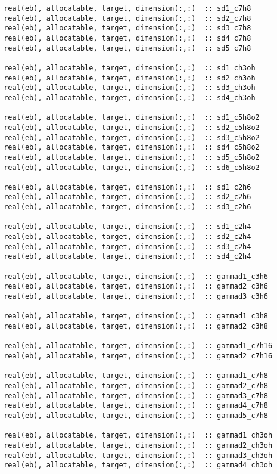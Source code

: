 \begin{lstlisting}
 real(eb), allocatable, target, dimension(:,:)  :: sd1_c7h8
 real(eb), allocatable, target, dimension(:,:)  :: sd2_c7h8
 real(eb), allocatable, target, dimension(:,:)  :: sd3_c7h8
 real(eb), allocatable, target, dimension(:,:)  :: sd4_c7h8
 real(eb), allocatable, target, dimension(:,:)  :: sd5_c7h8

 real(eb), allocatable, target, dimension(:,:)  :: sd1_ch3oh
 real(eb), allocatable, target, dimension(:,:)  :: sd2_ch3oh
 real(eb), allocatable, target, dimension(:,:)  :: sd3_ch3oh
 real(eb), allocatable, target, dimension(:,:)  :: sd4_ch3oh

 real(eb), allocatable, target, dimension(:,:)  :: sd1_c5h8o2
 real(eb), allocatable, target, dimension(:,:)  :: sd2_c5h8o2
 real(eb), allocatable, target, dimension(:,:)  :: sd3_c5h8o2
 real(eb), allocatable, target, dimension(:,:)  :: sd4_c5h8o2
 real(eb), allocatable, target, dimension(:,:)  :: sd5_c5h8o2
 real(eb), allocatable, target, dimension(:,:)  :: sd6_c5h8o2

 real(eb), allocatable, target, dimension(:,:)  :: sd1_c2h6
 real(eb), allocatable, target, dimension(:,:)  :: sd2_c2h6
 real(eb), allocatable, target, dimension(:,:)  :: sd3_c2h6

 real(eb), allocatable, target, dimension(:,:)  :: sd1_c2h4
 real(eb), allocatable, target, dimension(:,:)  :: sd2_c2h4
 real(eb), allocatable, target, dimension(:,:)  :: sd3_c2h4
 real(eb), allocatable, target, dimension(:,:)  :: sd4_c2h4

 real(eb), allocatable, target, dimension(:,:)  :: gammad1_c3h6
 real(eb), allocatable, target, dimension(:,:)  :: gammad2_c3h6
 real(eb), allocatable, target, dimension(:,:)  :: gammad3_c3h6

 real(eb), allocatable, target, dimension(:,:)  :: gammad1_c3h8
 real(eb), allocatable, target, dimension(:,:)  :: gammad2_c3h8

 real(eb), allocatable, target, dimension(:,:)  :: gammad1_c7h16
 real(eb), allocatable, target, dimension(:,:)  :: gammad2_c7h16

 real(eb), allocatable, target, dimension(:,:)  :: gammad1_c7h8
 real(eb), allocatable, target, dimension(:,:)  :: gammad2_c7h8
 real(eb), allocatable, target, dimension(:,:)  :: gammad3_c7h8
 real(eb), allocatable, target, dimension(:,:)  :: gammad4_c7h8
 real(eb), allocatable, target, dimension(:,:)  :: gammad5_c7h8

 real(eb), allocatable, target, dimension(:,:)  :: gammad1_ch3oh
 real(eb), allocatable, target, dimension(:,:)  :: gammad2_ch3oh
 real(eb), allocatable, target, dimension(:,:)  :: gammad3_ch3oh
 real(eb), allocatable, target, dimension(:,:)  :: gammad4_ch3oh


\end{lstlisting}
